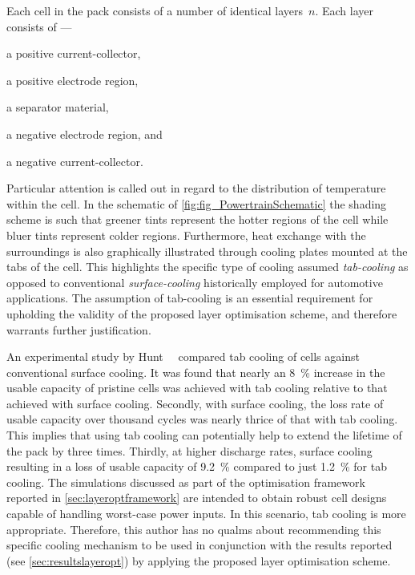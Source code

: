 Each cell in the pack consists of a number of identical layers~$n$. Each layer
consists of ---
\begin{enumerate*}[label=\roman*)]
    \item a positive current-collector,
    \item a positive electrode region,
    \item a separator material,
    \item a negative electrode region, and
    \item a negative current-collector.
\end{enumerate*}
Particular attention is called out in  regard to the distribution of temperature
within  the cell.  In  the schematic  of \cref{fig:fig_PowertrainSchematic}  the
shading scheme  is such that greener  tints represent the hotter  regions of the
cell while bluer tints represent colder regions. Furthermore, heat exchange with
the surroundings is also graphically  illustrated through cooling plates mounted
at the tabs  of the cell. This  highlights the specific type  of cooling assumed
\viz{}  \emph{tab-cooling}  as  opposed to  conventional  \emph{surface-cooling}
historically employed for automotive applications. The assumption of tab-cooling
is an  essential requirement for  upholding the  validity of the  proposed layer
optimisation scheme, and therefore warrants further justification.

An  experimental study  by  Hunt~\etal~\cite{Hunt2016} compared  tab cooling  of
cells  against  conventional  surface  cooling.  It was  found  that  nearly  an
\SI{8}{\percent} increase in the usable  capacity of pristine cells was achieved
with tab cooling relative to that  achieved with surface cooling. Secondly, with
surface  cooling, the  loss rate  of usable  capacity over  thousand cycles  was
nearly thrice of that with tab cooling.  This implies that using tab cooling can
potentially help to extend the lifetime of  the pack by three times. Thirdly, at
higher discharge rates,  surface cooling resulting in a loss  of usable capacity
of \SI{9.2}{\percent} compared  to just \SI{1.2}{\percent} for  tab cooling. The
simulations  discussed  as  part  of  the  optimisation  framework  reported  in
\cref{sec:layeroptframework} are intended to  obtain robust cell designs capable
of  handling worst-case  power inputs.  In this  scenario, tab  cooling is  more
appropriate.  Therefore,  this author  has  no  qualms about  recommending  this
specific cooling mechanism  to be used in conjunction with  the results reported
(see  \cref{sec:resultslayeropt}) by  applying the  proposed layer  optimisation
scheme.


